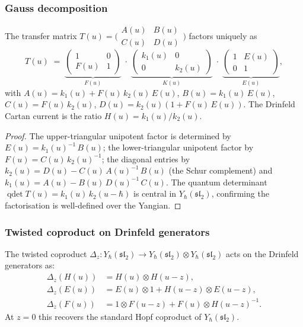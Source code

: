 \subsubsection*{Gauss decomposition}

\begin{proposition}
\ClaimStatusProvedHere
\label{prop:gauss-decomposition-sl2}
The transfer matrix $T(u) = \bigl(\begin{smallmatrix}
A(u) & B(u) \\ C(u) & D(u) \end{smallmatrix}\bigr)$
factors uniquely as
\[
T(u) \;=\;
\underbrace{\begin{pmatrix} 1 & 0 \\ F(u) & 1 \end{pmatrix}}_{F(u)}
\;\cdot\;
\underbrace{\begin{pmatrix} k_1(u) & 0 \\ 0 & k_2(u) \end{pmatrix}}_{K(u)}
\;\cdot\;
\underbrace{\begin{pmatrix} 1 & E(u) \\ 0 & 1 \end{pmatrix}}_{E(u)},
\]
with
$A(u) = k_1(u) + F(u)\,k_2(u)\,E(u)$,
$B(u) = k_1(u)\,E(u)$,
$C(u) = F(u)\,k_2(u)$,
$D(u) = k_2(u)(1 + F(u)\,E(u))$.
The Drinfeld Cartan current is the ratio
$H(u) = k_1(u)/k_2(u)$.
\end{proposition}

\begin{proof}
The upper-triangular unipotent factor is determined by
$E(u) = k_1(u)^{-1}\,B(u)$; the lower-triangular unipotent factor by
$F(u) = C(u)\,k_2(u)^{-1}$; the diagonal entries by
$k_2(u) = D(u) - C(u)\,A(u)^{-1}\,B(u)$ (the Schur complement) and
$k_1(u) = A(u) - B(u)\,D(u)^{-1}\,C(u)$. The quantum determinant
$\operatorname{qdet} T(u) = k_1(u)\,k_2(u{-}\hbar)$ is central in
$Y_\hbar(\mathfrak{sl}_2)$, confirming the factorisation is well-defined
over the Yangian.
\end{proof}

\subsubsection*{Twisted coproduct on Drinfeld generators}

\begin{theorem}
\ClaimStatusProvedHere
\label{thm:twisted-coproduct-sl2}
The twisted coproduct $\Delta_z \colon Y_\hbar(\mathfrak{sl}_2)
\to Y_\hbar(\mathfrak{sl}_2) \otimes Y_\hbar(\mathfrak{sl}_2)$
acts on the Drinfeld generators as:
\begin{align}
\label{eq:twisted-coprod-H}
\Delta_z(H(u)) &= H(u) \otimes H(u{-}z), \\
\label{eq:twisted-coprod-E}
\Delta_z(E(u)) &= E(u) \otimes 1 + H(u{-}z) \otimes E(u{-}z), \\
\label{eq:twisted-coprod-F}
\Delta_z(F(u)) &= 1 \otimes F(u{-}z) + F(u) \otimes H(u{-}z)^{-1}.
\end{align}
At $z = 0$ this recovers the standard Hopf coproduct of $Y_\hbar(\mathfrak{sl}_2)$.
\end{theorem}

